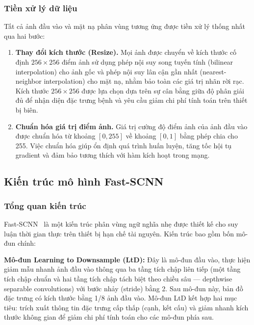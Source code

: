 \documentclass[conference]{IEEEtran}
\begin{document}
\subsubsection{Tiền xử lý dữ liệu}

Tất cả ảnh đầu vào và mặt nạ phân vùng tương ứng được tiền xử lý thống nhất qua hai bước:

\begin{enumerate}
  \item \textbf{Thay đổi kích thước (Resize).} Mọi ảnh được chuyển về kích thước cố định $256 \times 256$ điểm ảnh sử dụng phép nội suy song tuyến tính (bilinear interpolation) cho ảnh gốc và phép nội suy lân cận gần nhất (nearest-neighbor interpolation) cho mặt nạ, nhằm bảo toàn các giá trị nhãn rời rạc. Kích thước $256 \times 256$ được lựa chọn dựa trên sự cân bằng giữa độ phân giải đủ để nhận diện đặc trưng bệnh và yêu cầu giảm chi phí tính toán trên thiết bị biên.
  \item \textbf{Chuẩn hóa giá trị điểm ảnh.} Giá trị cường độ điểm ảnh của ảnh đầu vào được chuẩn hóa từ khoảng $[0, 255]$ về khoảng $[0, 1]$ bằng phép chia cho 255. Việc chuẩn hóa giúp ổn định quá trình huấn luyện, tăng tốc hội tụ gradient và đảm bảo tương thích với hàm kích hoạt trong mạng.
\end{enumerate}

\subsection{Kiến trúc mô hình Fast-SCNN}

\subsubsection{Tổng quan kiến trúc}

Fast-SCNN~\cite{fastscnn2019} là một kiến trúc phân vùng ngữ nghĩa nhẹ được thiết kế cho suy luận thời gian thực trên thiết bị hạn chế tài nguyên. Kiến trúc bao gồm bốn mô-đun chính:

\textbf{Mô-đun Learning to Downsample (LtD):} Đây là mô-đun đầu vào, thực hiện giảm mẫu nhanh ảnh đầu vào thông qua ba tầng tích chập liên tiếp (một tầng tích chập chuẩn và hai tầng tích chập tách biệt theo chiều sâu --- depthwise separable convolutions) với bước nhảy (stride) bằng 2. Sau mô-đun này, bản đồ đặc trưng có kích thước bằng 1/8 ảnh đầu vào. Mô-đun LtD kết hợp hai mục tiêu: trích xuất thông tin đặc trưng cấp thấp (cạnh, kết cấu) và giảm nhanh kích thước không gian để giảm chi phí tính toán cho các mô-đun phía sau.
\end{document}
